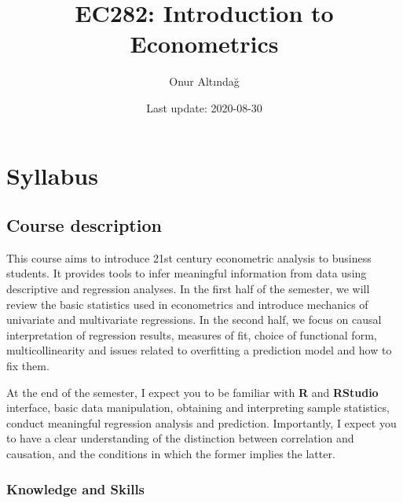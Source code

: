 \documentclass[
]{book}
\title{EC282: Introduction to Econometrics}
\author{Onur Altındağ}
\date{Last update: 2020-08-30}
\begin{document}
\maketitle

{
\setcounter{tocdepth}{1}
\tableofcontents
}
\hypertarget{syllabus}{%
\chapter*{Syllabus}\label{syllabus}}

\hypertarget{course-desctiption}{%
\section*{Course description}\label{course-desctiption}}

This course aims to introduce 21st century econometric analysis to business students. It provides tools to infer meaningful information from data using descriptive and regression analyses. In the first half of the semester, we will review the basic statistics used in econometrics and introduce mechanics of univariate and multivariate regressions. In the second half, we focus on causal interpretation of regression results, measures of fit, choice of functional form, multicollinearity and issues related to overfitting a prediction model and how to fix them.

At the end of the semester, I expect you to be familiar with \textbf{R} and \textbf{RStudio} interface, basic data manipulation, obtaining and interpreting sample statistics, conduct meaningful regression analysis and prediction. Importantly, I expect you to have a clear understanding of the distinction between correlation and causation, and the conditions in which the former implies the latter.

\hypertarget{knowledge}{%
\subsection*{Knowledge and Skills}\label{knowledge}}
\end{document}
